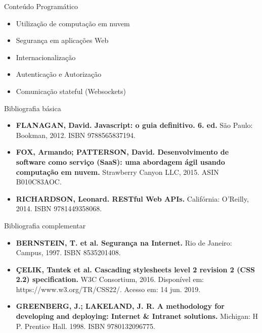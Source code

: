\documentclass{beamer}
\begin{document}
\begin{frame}{Conteúdo Programático}\justifying
      \begin{itemize}
            
            \item Utilização de computação em nuvem
            \item Segurança em aplicações Web
            \item Internacionalização
            \item Autenticação e Autorização
            \item Comunicação stateful (Websockets)
      \end{itemize}
\end{frame}


\begin{frame}{Bibliografia básica}\justifying
      \begin{itemize}
            \item \textbf{FLANAGAN, David. \textcolor{sintefdarkgreen}{Javascript: o guia definitivo. 6. ed.}} São Paulo: Bookman, 2012. ISBN 9788565837194.\\
            \item \textbf{FOX, Armando; PATTERSON, David. \textcolor{sintefdarkgreen}{Desenvolvimento de software como serviço (SaaS): uma abordagem ágil usando computação em nuvem.}} Strawberry Canyon LLC, 2015. ASIN B010C83AOC.\\
            \item \textbf{RICHARDSON, Leonard. \textcolor{sintefdarkgreen}{RESTful Web APIs.}} Califórnia: O’Reilly, 2014. ISBN 9781449358068. \\
      \end{itemize}
\end{frame}
      

\begin{frame}{Bibliografia complementar}
      \begin{itemize}
            \item \textbf{BERNSTEIN, T. et al. \textcolor{sintefdarkgreen}{Segurança na Internet.}}  Rio de Janeiro: Campus, 1997. ISBN
            8535201408.
            \item \textbf{ÇELIK, Tantek et al. \textcolor{sintefdarkgreen}{Cascading stylesheets level 2 revision 2 (CSS 2.2) specification.}} W3C Consortium, 2016. Disponível em: https://www.w3.org/TR/CSS22/. Acesso em: 14 jun. 2019.
            \item \textbf{GREENBERG, J.; LAKELAND, J. R. \textcolor{sintefdarkgreen}{A methodology for developing and deploying: Internet \& Intranet solutions.}} Michigan: H P. Prentice Hall. 1998. ISBN 9780132096775.
            
           
      \end{itemize}
\end{frame}
\end{document}
